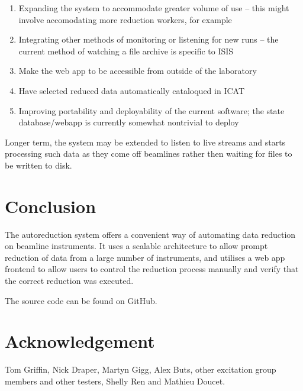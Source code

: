 \documentclass[twocolumn]{article}
\begin{document}
\begin{enumerate}
\item
  Expanding the system to accommodate greater volume of use -- this
  might involve accomodating more reduction workers, for example
\item
  Integrating other methods of monitoring or listening for new runs -- the current
  method of watching a file archive is specific to ISIS
\item
  Make the web app to be accessible from outside of the laboratory
\item
  Have selected reduced data automatically cataloqued in ICAT 
\item
  Improving portability and deployability of the current software; the
  state database/webapp is currently somewhat nontrivial to deploy
\end{enumerate}

Longer term, the system may be extended to listen to live streams and starts
processing such data as they come off beamlines rather then waiting for files 
to be written to disk. 

\section{Conclusion}\label{conclusion}

The autoreduction system offers a convenient way of automating data reduction
on beamline instruments. It uses a scalable architecture to allow prompt
reduction of data from a large number of instruments, and utilises a web app
frontend to allow users to control the reduction process manually and verify
that the correct reduction was executed.

The source code can be found on GitHub\cite{source}.

\section{Acknowledgement}\label{Acknowledgement}

Tom Griffin, Nick Draper, Martyn Gigg, Alex Buts, other excitation group members and other testers, Shelly Ren and Mathieu Doucet.
\end{document}
